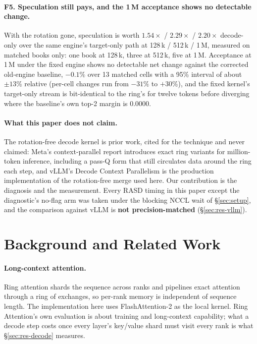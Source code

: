 \documentclass{article}
\begin{document}
\paragraph{F5. Speculation still pays, and the 1\,M acceptance shows no detectable change.}
With the rotation gone, speculation is worth $1.54\times$ / $2.29\times$ / $2.20\times$
decode-only over the same engine's target-only path at 128\,k / 512\,k / 1\,M, measured on
matched books only: one book at 128\,k, three at 512\,k, five at 1\,M. Acceptance at 1\,M
under the fixed engine shows no detectable net change against the corrected old-engine
baseline, $-0.1\%$ over 13 matched cells with a 95\% interval of about $\pm13\%$ relative
(per-cell changes run from $-31\%$ to $+30\%$), and the fixed kernel's target-only stream is bit-identical to the ring's for twelve
tokens before diverging where the baseline's own top-2 margin is 0.0000.

\paragraph{What this paper does not claim.} The rotation-free decode kernel is prior work,
cited for the technique and never claimed: Meta's context-parallel report
\citep{yang2024contextparallelism} introduces exact ring variants for million-token inference,
including a pass-Q form that still circulates data around the ring each step, and vLLM's
Decode Context Parallelism \citep{lee2026dcp} is the production implementation of the
rotation-free merge used here. Our contribution is the diagnosis and the measurement. Every
RASD timing in this paper except the diagnostic's no-flag arm was taken under the blocking
NCCL wait of \S\ref{sec:setup}, and the
comparison against vLLM is \textbf{not precision-matched} (\S\ref{sec:res-vllm}).

\section{Background and Related Work}
\label{sec:related}

\paragraph{Long-context attention.} Ring attention \citep{liu2023ringattention} shards the
sequence across ranks and pipelines exact attention through a ring of exchanges, so per-rank
memory is independent of sequence length. The implementation here uses FlashAttention-2
\citep{dao2024flashattention2} as the local kernel. Ring Attention's own evaluation is about
training and long-context capability; what a decode step costs once every layer's key/value
shard must visit every rank is what \S\ref{sec:res-decode} measures.
\end{document}

